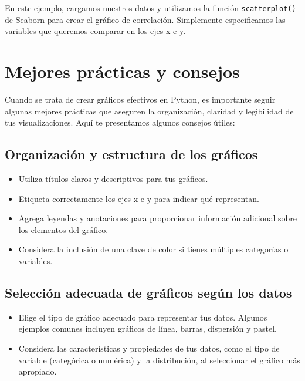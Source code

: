 \documentclass[
  a4paper,
]{article}
\providecommand{\tightlist}{%
  \setlength{\itemsep}{0pt}\setlength{\parskip}{0pt}}\usepackage{longtable,booktabs,array}
\begin{document}
En este ejemplo, cargamos nuestros datos y utilizamos la función
\texttt{scatterplot()} de Seaborn para crear el gráfico de correlación.
Simplemente especificamos las variables que queremos comparar en los
ejes x e y.

\hypertarget{mejores-pruxe1cticas-y-consejos}{%
\section{Mejores prácticas y
consejos}\label{mejores-pruxe1cticas-y-consejos}}

Cuando se trata de crear gráficos efectivos en Python, es importante
seguir algunas mejores prácticas que aseguren la organización, claridad
y legibilidad de tus visualizaciones. Aquí te presentamos algunos
consejos útiles:

\hypertarget{organizaciuxf3n-y-estructura-de-los-gruxe1ficos}{%
\subsection{Organización y estructura de los
gráficos}\label{organizaciuxf3n-y-estructura-de-los-gruxe1ficos}}

\begin{itemize}
\tightlist
\item
  Utiliza títulos claros y descriptivos para tus gráficos.
\item
  Etiqueta correctamente los ejes x e y para indicar qué representan.
\item
  Agrega leyendas y anotaciones para proporcionar información adicional
  sobre los elementos del gráfico.
\item
  Considera la inclusión de una clave de color si tienes múltiples
  categorías o variables.
\end{itemize}

\hypertarget{selecciuxf3n-adecuada-de-gruxe1ficos-seguxfan-los-datos}{%
\subsection{Selección adecuada de gráficos según los
datos}\label{selecciuxf3n-adecuada-de-gruxe1ficos-seguxfan-los-datos}}

\begin{itemize}
\tightlist
\item
  Elige el tipo de gráfico adecuado para representar tus datos. Algunos
  ejemplos comunes incluyen gráficos de línea, barras, dispersión y
  pastel.
\item
  Considera las características y propiedades de tus datos, como el tipo
  de variable (categórica o numérica) y la distribución, al seleccionar
  el gráfico más apropiado.
\end{itemize}
\end{document}
